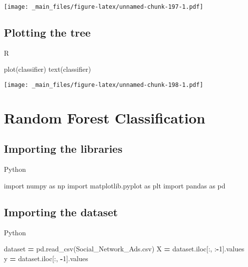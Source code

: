 \documentclass[
]{book}
\newenvironment{Shaded}{\begin{snugshade}}{\end{snugshade}}
\newcommand{\DecValTok}[1]{\textcolor[rgb]{0.00,0.00,0.81}{#1}}
\newcommand{\FunctionTok}[1]{\textcolor[rgb]{0.00,0.00,0.00}{#1}}
\newcommand{\ImportTok}[1]{#1}
\newcommand{\NormalTok}[1]{#1}
\newcommand{\OperatorTok}[1]{\textcolor[rgb]{0.81,0.36,0.00}{\textbf{#1}}}
\newcommand{\StringTok}[1]{\textcolor[rgb]{0.31,0.60,0.02}{#1}}
\theoremstyle{definition}
\theoremstyle{definition}
\theoremstyle{definition}
\theoremstyle{definition}
\theoremstyle{remark}
\begin{document}
\texttt{[image: \_main\_files/figure-latex/unnamed-chunk-197-1.pdf]}

\hypertarget{plotting-the-tree-1}{%
\subsection{Plotting the tree}\label{plotting-the-tree-1}}

R

\begin{Shaded}
\begin{Highlighting}[]
\FunctionTok{plot}\NormalTok{(classifier)}
\FunctionTok{text}\NormalTok{(classifier)}
\end{Highlighting}
\end{Shaded}

\texttt{[image: \_main\_files/figure-latex/unnamed-chunk-198-1.pdf]}

\hypertarget{random-forest-classification}{%
\section{Random Forest Classification}\label{random-forest-classification}}

\hypertarget{importing-the-libraries-13}{%
\subsection{Importing the libraries}\label{importing-the-libraries-13}}

Python

\begin{Shaded}
\begin{Highlighting}[]
\ImportTok{import}\NormalTok{ numpy }\ImportTok{as}\NormalTok{ np}
\ImportTok{import}\NormalTok{ matplotlib.pyplot }\ImportTok{as}\NormalTok{ plt}
\ImportTok{import}\NormalTok{ pandas }\ImportTok{as}\NormalTok{ pd}
\end{Highlighting}
\end{Shaded}

\hypertarget{importing-the-dataset-13}{%
\subsection{Importing the dataset}\label{importing-the-dataset-13}}

Python

\begin{Shaded}
\begin{Highlighting}[]
\NormalTok{dataset }\OperatorTok{=}\NormalTok{ pd.read\_csv(}\StringTok{\textquotesingle{}Social\_Network\_Ads.csv\textquotesingle{}}\NormalTok{)}
\NormalTok{X }\OperatorTok{=}\NormalTok{ dataset.iloc[:, :}\OperatorTok{{-}}\DecValTok{1}\NormalTok{].values}
\NormalTok{y }\OperatorTok{=}\NormalTok{ dataset.iloc[:, }\OperatorTok{{-}}\DecValTok{1}\NormalTok{].values}
\end{Highlighting}
\end{Shaded}
\end{document}
